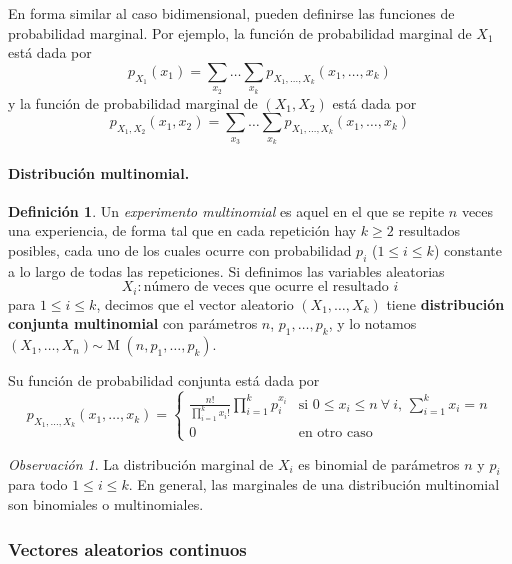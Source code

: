 \documentclass[11pt]{article}
\theoremstyle{plain}
\theoremstyle{definition}
\newtheorem*{defi}{Definición}
\theoremstyle{remark}
\newtheorem*{obs}{Observación}
\newcommand{\deft}[1]{\textbf{#1}}  %
\newcommand{\foralle}{\ensuremath{\forall \ }}  %
\newcommand{\dist}[1]{\ensuremath{\sim \operatorname{#1}}}  %
\begin{document}
      En forma similar al caso bidimensional, pueden definirse las funciones de probabilidad marginal. Por ejemplo, la función de probabilidad marginal de $X_1$ está dada por
      \[ p_{X_1}(x_1) = \sum_{x_2} \dots \sum_{x_k} p_{X_1, \dots, X_k} (x_1, \dots, x_k) \]
      y la función de probabilidad marginal de $(X_1,X_2)$ está dada por
      \[ p_{X_1,X_2}(x_1,x_2) = \sum_{x_3} \dots \sum_{x_k} p_{X_1, \dots, X_k} (x_1, \dots, x_k) \]

      \paragraph{Distribución multinomial.}

      \begin{defi}
        Un \emph{experimento multinomial} es aquel en el que se repite $n$ veces una experiencia, de forma tal que en cada repetición hay $k \geq 2$ resultados posibles, cada uno de los cuales ocurre con probabilidad $p_i$ ($1 \leq i \leq k$) constante a lo largo de todas las repeticiones.
        Si definimos las variables aleatorias
        \[ X_i : \text{número de veces que ocurre el resultado $i$} \]
        para $1 \leq i \leq k$, decimos que el vector aleatorio $(X_1, \dots, X_k)$ tiene \deft{distribución conjunta multinomial} con parámetros $n$, $p_1, \dots, p_k$, y lo notamos $(X_1, \dots, X_n) \dist{M}(n,p_1,\dots,p_k)$.
      \end{defi}

      Su función de probabilidad conjunta está dada por
      \[ p_{X_1,\dots,X_k}(x_1,\dots,x_k) = \begin{cases}
        \displaystyle \frac{n!}{\prod_{i=1}^k x_i!} \prod_{i=1}^k p_i^{x_i} & \text{si $0 \leq x_i \leq n \ \foralle i$, $\sum_{i=1}^k x_i = n$} \\
        0 & \text{en otro caso}
      \end{cases} \]

      \begin{obs}
        La distribución marginal de $X_i$ es binomial de parámetros $n$ y $p_i$ para todo $1 \leq i \leq k$. En general, las marginales de una distribución multinomial son binomiales o multinomiales.
      \end{obs}

    \subsubsection{Vectores aleatorios continuos}
\end{document}
